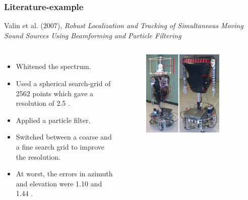 \documentclass{beamer}
\begin{document}
%
%

\begin{frame}
\frametitle{Literature-example}

Valin et al. (2007), \textit{Robust Localization and Tracking of Simultaneous Moving Sound Sources Using Beamforming and Particle Filtering} \cite{valin_robust_2007}

\begin{columns}

\begin{itemize}
	\item Whitened the spectrum.
	\item Used a spherical search-grid of 2562 points which gave a resolution of 2.5 \si{\deg}.
	\item Applied a particle filter.
	\item Switched between a coarse and a fine search grid to improve the resolution.
	\item At worst, the errors in azimuth and elevation were 1.10 and 1.44 \si{\deg}.
\end{itemize}

\begin{figure}[H]
\includegraphics[width=0.9\textwidth]{./valin_2007/array.jpg}
\centering
\end{figure}
\cite{valin_robust_2007}


\end{columns}
\end{frame}
\end{document}
